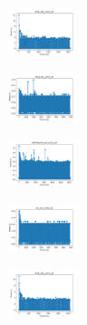 \begin{figure}[H]
\begin{subfigure}
    \end{subfigure}
    \hfill
    \begin{subfigure}
        \centering
        \includegraphics[width=0.234\textwidth]{img/am01mej/ecoli_set_const_20_589741062_time.png}
    \end{subfigure}
    \hfill
    \begin{subfigure}
        \centering
        \includegraphics[width=0.234\textwidth]{img/am01mej/rand_set_const_20_589741062_time.png}
    \end{subfigure}
    \hfill
    \begin{subfigure}
        \centering
        \includegraphics[width=0.234\textwidth]{img/am01mej/newthyroid_set_const_20_589741062_time.png}
    \end{subfigure}
    \hfill
    \begin{subfigure}
        \centering
        \includegraphics[width=0.234\textwidth]{img/am01mej/iris_set_const_20_277451237_time.png}
    \end{subfigure}
    \hfill
    \begin{subfigure}
        \centering
        \includegraphics[width=0.234\textwidth]{img/am01mej/ecoli_set_const_20_277451237_time.png}
    \end{subfigure}

\end{figure}
